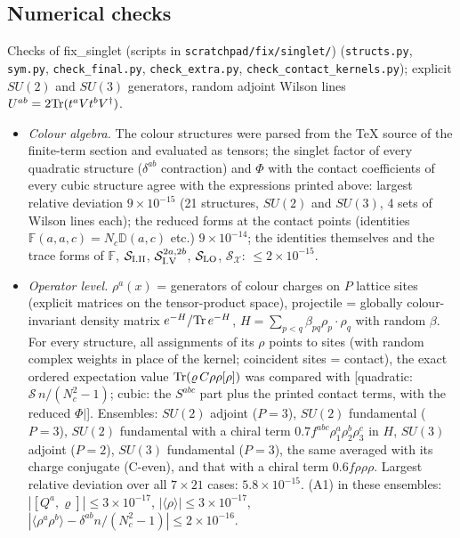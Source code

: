 \documentclass[9pt]{article}
\def\mf#1{\mathbb{#1}}
\numberwithin{equation}{section}
\begin{document}
{\subsection{Numerical checks}\label{sec:s-checks}
\sloppy\noindent Checks of fix\_singlet (scripts in \texttt{scratchpad/fix/singlet/}) (\texttt{structs.py}, \texttt{sym.py}, \texttt{check\_final.py}, \texttt{check\_extra.py}, \texttt{check\_contact\_kernels.py}); explicit $SU(2)$ and $SU(3)$ generators, random adjoint Wilson lines $U^{ab}=2{\rm Tr}(t^{a}Vt^{b}V^{\dagger})$.
\begin{itemize}
\item \emph{Colour algebra.} The colour structures were parsed from the TeX source of the finite-term section and evaluated as tensors; the singlet factor of every quadratic structure ($\delta^{ab}$ contraction) and $\Phi$ with the contact coefficients of every cubic structure agree with the expressions printed above: largest relative deviation $9\times10^{-15}$ (21 structures, $SU(2)$ and $SU(3)$, 4 sets of Wilson lines each); the reduced forms at the contact points (identities $\mf{F}(a,a,c)=N_{c}\mf{D}(a,c)$ etc.) $9\times10^{-14}$; the identities themselves and the trace forms of $\mf{F}$, $\mathcal{S}_{\rm I.II}$, $\mathcal{S}^{2a,2b}_{\rm I.V}$, $\mathcal{S}_{\rm LO}$, $\mathcal{S}_{\mathcal{X}}$: $\le2\times10^{-15}$.
\item \emph{Operator level.} $\rho^{a}(x)$ = generators of colour charges on $P$ lattice sites (explicit matrices on the tensor-product space), projectile = globally colour-invariant density matrix $e^{-H}/{\rm Tr}\,e^{-H}$, $H=\sum_{p<q}\beta_{pq}\rho_{p}\cdot\rho_{q}$ with random $\beta$. For every structure, all assignments of its $\rho$ points to sites (with random complex weights in place of the kernel; coincident sites = contact), the exact ordered expectation value ${\rm Tr}(\varrho\,C\rho\rho[\rho])$ was compared with [quadratic: $\mathcal{S}\,n/(N_{c}^{2}-1)$; cubic: the $S^{abc}$ part plus the printed contact terms, with the reduced $\Phi|$]. Ensembles: $SU(2)$ adjoint ($P=3$), $SU(2)$ fundamental ($P=3$), $SU(2)$ fundamental with a chiral term $0.7f^{abc}\rho^{a}_{1}\rho^{b}_{2}\rho^{c}_{3}$ in $H$, $SU(3)$ adjoint ($P=2$), $SU(3)$ fundamental ($P=3$), the same averaged with its charge conjugate (C-even), and that with a chiral term $0.6f\rho\rho\rho$. Largest relative deviation over all $7\times21$ cases: $5.8\times10^{-15}$. (A1) in these ensembles: $|[Q^{a},\varrho]|\le3\times10^{-17}$, $|\langle\rho\rangle|\le3\times10^{-17}$, $|\langle\rho^{a}\rho^{b}\rangle-\delta^{ab}n/(N_{c}^{2}-1)|\le2\times10^{-16}$.

\end{itemize}}
\end{document}
